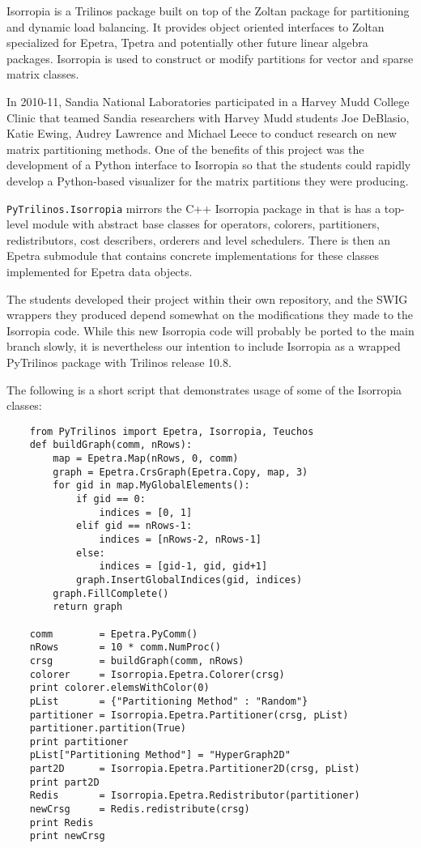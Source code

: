 \documentclass[11pt]{article}
\begin{document}
Isorropia is a Trilinos package built on top of the Zoltan package for partitioning and dynamic load balancing.  It provides object oriented interfaces to Zoltan specialized for Epetra, Tpetra and potentially other future linear algebra packages.  Isorropia is used to construct or modify partitions for vector and sparse matrix classes.

In 2010-11, Sandia National Laboratories participated in a Harvey Mudd College Clinic that teamed Sandia researchers with Harvey Mudd students Joe DeBlasio, Katie Ewing, Audrey Lawrence and Michael Leece to conduct research on new matrix partitioning methods.  One of the benefits of this project was the development of a Python interface to Isorropia so that the students could rapidly develop a Python-based visualizer for the matrix partitions they were producing.

{\tt PyTrilinos.Isorropia} mirrors the C++ Isorropia package in that is has a top-level module with abstract base classes for operators, colorers, partitioners, redistributors, cost describers, orderers and level schedulers.  There is then an Epetra submodule that contains concrete implementations for these classes implemented for Epetra data objects.

The students developed their project within their own repository, and the SWIG wrappers they produced depend somewhat on the modifications they made to the Isorropia code.  While this new Isorropia code will probably be ported to the main branch slowly, it is nevertheless our intention to include Isorropia as a wrapped PyTrilinos package with Trilinos release 10.8.

The following is a short script that demonstrates usage of some of the Isorropia classes:
\begin{verbatim}
    from PyTrilinos import Epetra, Isorropia, Teuchos
    def buildGraph(comm, nRows):
        map = Epetra.Map(nRows, 0, comm)
        graph = Epetra.CrsGraph(Epetra.Copy, map, 3)
        for gid in map.MyGlobalElements():
            if gid == 0:
                indices = [0, 1]
            elif gid == nRows-1:
                indices = [nRows-2, nRows-1]
            else:
                indices = [gid-1, gid, gid+1]
            graph.InsertGlobalIndices(gid, indices)
        graph.FillComplete()
        return graph

    comm        = Epetra.PyComm()
    nRows       = 10 * comm.NumProc()
    crsg        = buildGraph(comm, nRows)
    colorer     = Isorropia.Epetra.Colorer(crsg)
    print colorer.elemsWithColor(0)
    pList       = {"Partitioning Method" : "Random"}
    partitioner = Isorropia.Epetra.Partitioner(crsg, pList)
    partitioner.partition(True)
    print partitioner
    pList["Partitioning Method"] = "HyperGraph2D"
    part2D      = Isorropia.Epetra.Partitioner2D(crsg, pList)
    print part2D
    Redis       = Isorropia.Epetra.Redistributor(partitioner)
    newCrsg     = Redis.redistribute(crsg)
    print Redis
    print newCrsg
\end{verbatim}
\end{document}
